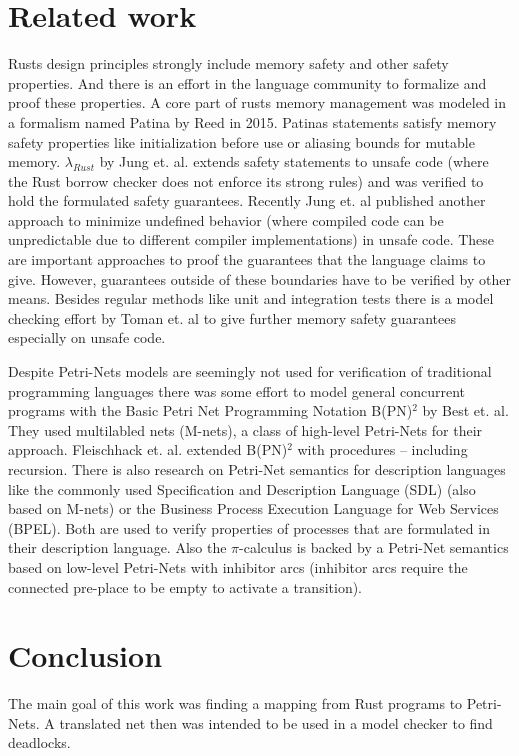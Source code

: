\chapter{Related work}
Rusts design principles strongly include memory safety and other safety properties.
And there is an effort in the language community to formalize and proof these properties.
A core part of rusts memory management was modeled in a formalism named Patina by Reed\cite{reed2015patina} in 2015.
Patinas statements satisfy memory safety properties like initialization before use or aliasing bounds for mutable memory.
$\lambda_{Rust}$ by Jung et. al.\cite{Jung:2017:RSF:3177123.3158154} extends safety statements to unsafe code (where the Rust borrow checker does not enforce its strong rules) and was verified to hold the formulated safety guarantees.
Recently Jung et. al published another approach to minimize undefined behavior (where compiled code can be unpredictable due to different compiler implementations) in unsafe code.
These are important approaches to proof the guarantees that the language claims to give.
However, guarantees outside of these boundaries have to be verified by other means.
Besides regular methods like unit and integration tests there is a model checking effort by Toman et. al \cite{toman2015crust} to give further memory safety guarantees especially on unsafe code.

Despite Petri-Nets models are seemingly not used for verification of traditional programming languages there was some effort to model general concurrent programs with the Basic Petri Net Programming Notation B(PN)$^2$ by Best et. al\cite{Best1993BPN2A}.
They used multilabled nets (M-nets)\cite{best1995class}, a class of high-level Petri-Nets for their approach.
Fleischhack et. al. extended B(PN)$^2$ with procedures -- including recursion\cite{fleischhack1997petri}.
There is also research on Petri-Net semantics for description languages like the commonly used Specification and Description Language (SDL)\cite{fleischhack1998compositional} (also based on M-nets) or the Business Process Execution Language for Web Services (BPEL)\cite{stahl2005petri}\cite{lohmann2007feature}.
Both are used to verify properties of processes that are formulated in their description language.
Also the $\pi$-calculus is backed by a Petri-Net semantics\cite{busi1995petri} based on low-level Petri-Nets with inhibitor arcs (inhibitor arcs require the connected pre-place to be empty to activate a transition).

\chapter{Conclusion}
\label{conclusion}
The main goal of this work was finding a mapping from Rust programs to Petri-Nets.
A translated net then was intended to be used in a model checker to find deadlocks.


